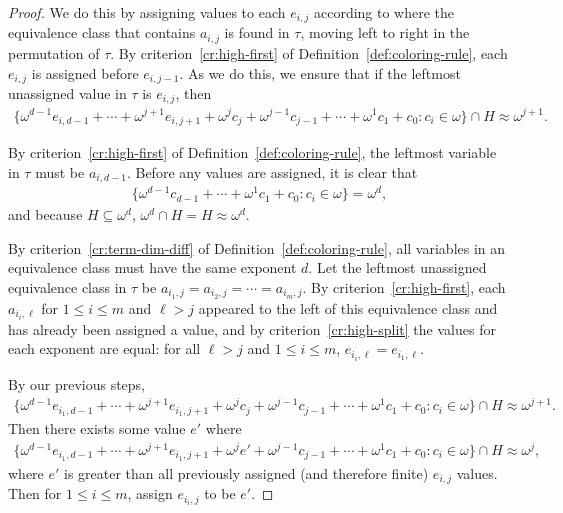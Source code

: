 \documentclass[10pt,a4paper]{article}
\newcommand{\om}{\omega}
\newcommand{\oequiv}{\approx}
\newcommand{\inumpoints}{i}
\newcommand{\idegr}{j}
\newcommand{\commonconst}{a}
\theoremstyle{plain}
\theoremstyle{definition}
\begin{document}
\begin{proof}
We do this by assigning values to each $e_{\inumpoints,\idegr}$ according to where the equivalence class
that contains $\commonconst_{\inumpoints,\idegr}$ is found in $\tau$, moving left to right in the permutation of $\tau$. By criterion~\ref{cr:high-first}
of Definition~\ref{def:coloring-rule}, 
each $e_{\inumpoints,\idegr}$ is assigned before $e_{\inumpoints,\idegr-1}$. As we do this, we ensure that if the leftmost unassigned value in $\tau$ is $e_{\inumpoints,\idegr}$, then \begin{multline*}\{ \om^{d-1} e_{\inumpoints,d-1} + \cdots + \om^{\idegr+1} e_{\inumpoints,\idegr+1} + \om^\idegr c_{\idegr} + \om^{\idegr-1} c_{\idegr-1} + \cdots + \om^1 c_1 + c_0 : c_i \in \om\} \cap H \oequiv \om^{\idegr+1}.\end{multline*}

By criterion~\ref{cr:high-first} of 
Definition~\ref{def:coloring-rule}, 
the leftmost variable in $\tau$ must be $\commonconst_{\inumpoints,d-1}$. Before any values are assigned, it is clear that \begin{align*}\{ \om^{d-1} c_{d-1} + \cdots + \om^1 c_1 + c_0 : c_i \in \om\} = \om^{d},\end{align*} and because $H \subseteq \om^{d}$, $\om^{d} \cap H = H \oequiv \om^{d}$.

By criterion~\ref{cr:term-dim-diff} of 
Definition~\ref{def:coloring-rule}, all variables in an equivalence class must have the same exponent $d$. Let the leftmost unassigned equivalence class in $\tau$ be $\commonconst_{\inumpoints_1,\idegr} = \commonconst_{\inumpoints_2,\idegr} = \cdots = \commonconst_{\inumpoints_m,\idegr}$.
By criterion~\ref{cr:high-first}, each $\commonconst_{\inumpoints_i,\ell}$ for $1 \leq i \leq m$ and $\ell > \idegr$ appeared to the left of this equivalence class and has already been assigned a value, and by criterion~\ref{cr:high-split} the values for each exponent are equal: for all $\ell > \idegr$ and $1 \leq i \leq m$, $e_{\inumpoints_i,\ell} = e_{\inumpoints_1,\ell}$.

By our previous steps, \begin{multline*}\{ \om^{d-1} e_{\inumpoints_1,d-1} + \cdots + \om^{\idegr+1} e_{\inumpoints_1,\idegr+1} + \om^{\idegr} c_{\idegr} + \om^{\idegr-1} c_{\idegr-1} + \cdots + \om^1 c_1 + c_0 : c_i \in \om\} \cap H \oequiv \om^{\idegr+1}.\end{multline*}
Then there exists some value $e'$ where \begin{multline*}\{ \om^{d-1} e_{\inumpoints_1,d-1} + \cdots + \om^{\idegr+1} e_{\inumpoints_1,\idegr+1} + \om^{\idegr} e' + \om^{\idegr-1} c_{\idegr-1} + \cdots + \om^1 c_1 + c_0 : c_i \in \om\} \cap H \oequiv \om^{\idegr},
\end{multline*} where $e'$ is greater than all previously assigned (and therefore finite) $e_{\inumpoints,\idegr}$ values. Then for $1 \leq i \leq m$, assign $e_{\inumpoints_i,\idegr}$ to be $e'$.


\end{proof}
\end{document}
